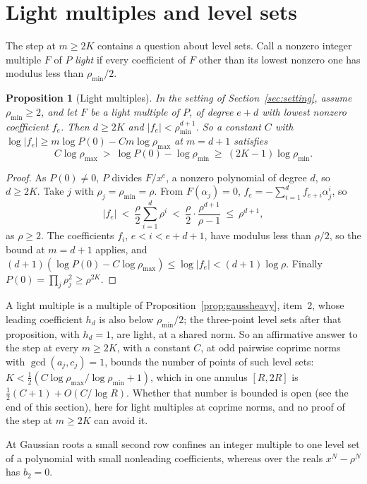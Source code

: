 \documentclass[11pt]{article}
\newtheorem{proposition}[theorem]{Proposition}
\begin{document}
\section{Light multiples and level sets}\label{sec:light}

The step at $m\ge2K$ contains a question about level sets.  Call a nonzero
integer multiple $F$ of $P$ \emph{light} if every coefficient of $F$ other than
its lowest nonzero one has modulus less than $\rho_{\min}/2$.

\begin{proposition}[Light multiples]\label{prop:gausslight}
In the setting of Section~\ref{sec:setting}, assume $\rho_{\min}\ge2$, and
let $F$ be a light multiple of $P$, of degree $e+d$ with lowest nonzero
coefficient $f_e$.  Then $d\ge2K$ and $|f_e|<\rho_{\min}^{d+1}$.  So a constant
$C$ with $\log|f_e|\ge m\log P(0)-Cm\log\rho_{\max}$ at $m=d+1$ satisfies
\[
  C\log\rho_{\max}\ >\ \log P(0)-\log\rho_{\min}\ \ge\ (2K-1)\log\rho_{\min}.
\]
\end{proposition}

\begin{proof}
As $P(0)\ne0$, $P$ divides $F/x^e$, a nonzero polynomial of degree $d$, so
$d\ge2K$.  Take $j$ with $\rho_j=\rho_{\min}=\rho$.  From
$F(\alpha_j)=0$, $f_e=-\sum_{i=1}^df_{e+i}\alpha_j^i$, so
\[
  |f_e|\ <\ \frac\rho2\sum_{i=1}^d\rho^i\ <\ \frac\rho2\cdot\frac{\rho^{d+1}}{\rho-1}
  \ \le\ \rho^{d+1},
\]
as $\rho\ge2$.  The coefficients $f_i$, $e<i<e+d+1$, have modulus less than
$\rho/2$, so the bound at $m=d+1$ applies, and
$(d+1)(\log P(0)-C\log\rho_{\max})\le\log|f_e|<(d+1)\log\rho$.  Finally
$P(0)=\prod_j\rho_j^2\ge\rho^{2K}$.
\end{proof}

A light multiple is a multiple of Proposition~\ref{prop:gaussheavy}, item~2,
whose leading coefficient $h_d$ is also below $\rho_{\min}/2$; the three-point
level sets after that proposition, with $h_d=1$, are light, at a shared norm.
So an affirmative answer to the step at every $m\ge2K$, with a constant $C$,
at odd pairwise coprime norms with $\gcd(a_j,c_j)=1$, bounds the number of
points of such level sets:
$K<\frac12(C\log\rho_{\max}/\log\rho_{\min}+1)$, which in one annulus
$[R,2R]$ is $\frac12(C+1)+O(C/\log R)$.  Whether that number is bounded is
open (see the end of this section), here for light multiples at coprime
norms, and no proof of the step at $m\ge2K$ can avoid it.

At Gaussian roots a small second row confines an integer multiple to one
level set of a polynomial with small nonleading coefficients, whereas over
the reals $x^N-\rho^N$ has $b_2=0$.
\end{document}
